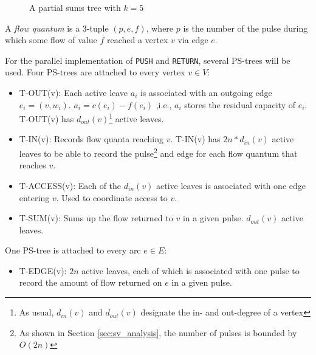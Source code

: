 \documentclass[a4paper,10pt, twocolumn]{article}
\begin{document}
\begin{figure}[H]
\begin{center}
\end{center}
\caption{A partial sums tree with $k=5$}
\label{fig:pstree}
\end{figure}

A \emph{flow quantum} is a 3-tuple $(p, e, f)$, where $p$ is the number of the pulse during which some flow of value $f$ reached a vertex $v$ via edge $e$.

For the parallel implementation of \lstinline|PUSH| and \lstinline|RETURN|, several PS-trees will be used. Four PS-trees are attached to every vertex $v \in V$:
\begin{itemize}
	\item T-OUT(v): Each active leave $a_i$ is associated with an outgoing edge $e_i = (v, w_i)$. $a_i = c(e_i) - f(e_i)$ ,i.e., $a_i$ stores the residual capacity of $e_i$. T-OUT(v) has $d_{out}(v)$\footnote{As usual, $d_{in}(v)$ and $d_{out}(v)$ designate the in- and out-degree of a vertex} active leaves.
	\item T-IN(v): Records flow quanta reaching $v$. T-IN(v) has $2n*d_{in}(v)$ active leaves to be able to record the pulse\footnote{As shown in Section \ref{sec:sv_analysis}, the number of pulses is bounded by $O(2n)$} and edge for each flow quantum that reaches $v$. 
	\item T-ACCESS(v): Each of the $d_{in}(v)$ active leaves is associated with one edge entering $v$. Used to coordinate access to $v$.
	\item T-SUM(v): Sums up the flow returned to $v$ in a given pulse. $d_{out}(v)$ active leaves. 
\end{itemize}
One PS-tree is attached to every arc $e \in E$:
\begin{itemize}
	\item T-EDGE(v): $2n$ active leaves, each of which is associated with one pulse to record the amount of flow returned on $e$ in a given pulse.
\end{itemize}
\end{document}
